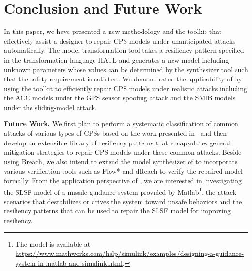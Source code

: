 \section{Conclusion and Future Work}
%
In this paper, we have presented a new methodology and the toolkit \toolreaffirm that effectively assist a designer to repair CPS models under unanticipated attacks automatically. 
%
The model transformation tool takes a resiliency pattern specified in the transformation language HATL and generates a new model including unknown parameters whose values can be determined by the synthesizer tool such that the safety requirement is satisfied.
%
We demonstrated the applicability of \toolreaffirm by using the toolkit to efficiently repair CPS models under realistic attacks including the ACC models under the GPS sensor spoofing attack and the SMIB models under the sliding-model attack.

\vspace{0.5em}
\noindent
{\bf Future Work.} We first plan to perform a systematic classification of common attacks of various types of CPSs based on the work presented in~\cite{humayed2017cyber} and then develop an extensible library of resiliency patterns that encapsulates general mitigation strategies to repair CPS models under these common attacks.
%
Beside using Breach, we also intend to extend the model synthesizer of \toolreaffirm to incorporate various verification tools such as Flow* and dReach to verify the repaired model formally.
%
From the application perspective of \toolreaffirm, we are interested in investigating the SLSF model of a missile guidance system provided by Matlab\footnote{The model is available at \url{https://www.mathworks.com/help/simulink/examples/designing-a-guidance-system-in-matlab-and-simulink.html}.}, the attack scenarios that destabilizes or drives the system toward unsafe behaviors and the resiliency patterns that can be used to repair the SLSF model for improving resiliency.

